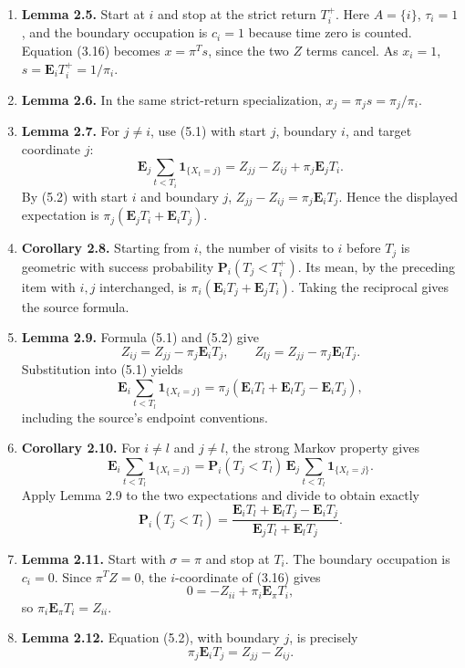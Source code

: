 \documentclass[11pt]{article}
\newcommand{\E}{\mathbf E}
\newcommand{\Pp}{\mathbf P}
\begin{document}
\begin{enumerate}
\item \textbf{Lemma 2.5.}  Start at $i$ and stop at the strict return $T_i^+$.  Here $A=\{i\}$, $\tau_i=1$, and the boundary occupation is $c_i=1$ because time zero is counted.  Equation (3.16) becomes $x=\pi^Ts$, since the two $Z$ terms cancel.  As $x_i=1$, $s=\E_iT_i^+=1/\pi_i$.

\item \textbf{Lemma 2.6.}  In the same strict-return specialization, $x_j=\pi_j s=\pi_j/\pi_i$.

\item \textbf{Lemma 2.7.}  For $j\ne i$, use (5.1) with start $j$, boundary $i$, and target coordinate $j$:
\[
\E_j\sum_{t<T_i}\mathbf1_{\{X_t=j\}}
=Z_{jj}-Z_{ij}+\pi_j\E_jT_i.
\]
By (5.2) with start $i$ and boundary $j$, $Z_{jj}-Z_{ij}=\pi_j\E_iT_j$.  Hence the displayed expectation is $\pi_j(\E_jT_i+\E_iT_j)$.

\item \textbf{Corollary 2.8.}  Starting from $i$, the number of visits to $i$ before $T_j$ is geometric with success probability $\Pp_i(T_j<T_i^+)$.  Its mean, by the preceding item with $i,j$ interchanged, is $\pi_i(\E_iT_j+\E_jT_i)$.  Taking the reciprocal gives the source formula.

\item \textbf{Lemma 2.9.}  Formula (5.1) and (5.2) give
\[
Z_{ij}=Z_{jj}-\pi_j\E_iT_j,
\qquad
Z_{lj}=Z_{jj}-\pi_j\E_lT_j.
\]
Substitution into (5.1) yields
\[
\E_i\sum_{t<T_l}\mathbf1_{\{X_t=j\}}
=\pi_j(\E_iT_l+\E_lT_j-\E_iT_j),
\]
including the source's endpoint conventions.

\item \textbf{Corollary 2.10.}  For $i\ne l$ and $j\ne l$, the strong Markov property gives
\[
\E_i\sum_{t<T_l}\mathbf1_{\{X_t=j\}}
=\Pp_i(T_j<T_l)\,
\E_j\sum_{t<T_l}\mathbf1_{\{X_t=j\}}.
\]
Apply Lemma 2.9 to the two expectations and divide to obtain exactly
\[
\Pp_i(T_j<T_l)
=\frac{\E_iT_l+\E_lT_j-\E_iT_j}{\E_jT_l+\E_lT_j}.
\]

\item \textbf{Lemma 2.11.}  Start with $\sigma=\pi$ and stop at $T_i$.  The boundary occupation is $c_i=0$.  Since $\pi^TZ=0$, the $i$-coordinate of (3.16) gives
\[
0=-Z_{ii}+\pi_i\E_\pi T_i,
\]
so $\pi_i\E_\pi T_i=Z_{ii}$.

\item \textbf{Lemma 2.12.}  Equation (5.2), with boundary $j$, is precisely
\[
\pi_j\E_iT_j=Z_{jj}-Z_{ij}.
\]


\end{enumerate}
\end{document}
